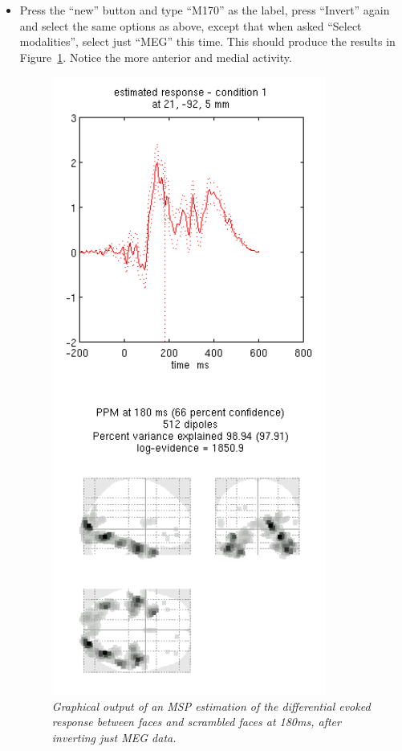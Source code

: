 \begin{itemize}
\item Press the ``new'' button and type ``M170'' as the label, press ``Invert'' again and select the same options as above, except that when asked ``Select modalities'', select just ``MEG'' this time. This should produce the results in Figure~\ref{multimodal:fusion:fig:3}. Notice the more anterior and medial activity.

\begin{figure}
\begin{center}
\includegraphics[width=90mm]{multimodal/figures/fused_meg_msp.png}
\caption{\em Graphical output of an MSP estimation of the differential evoked response between faces and scrambled faces at 180ms, after inverting just MEG data. \label{multimodal:fusion:fig:3}}
\end{center}
\end{figure}

\end{itemize}

